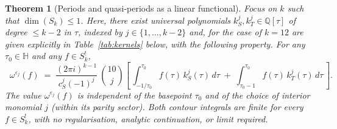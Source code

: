 \documentclass[11pt,letterpaper]{article}
\newtheorem{theorem}{Theorem}[section]
\newcommand{\HH}{\mathbb{H}}
\newcommand{\QQ}{\mathbb{Q}}
\newcommand{\eps}{\varepsilon}
\begin{document}
\begin{theorem}[Periods and quasi-periods as a linear functional]\label{thm:mainP}
Focus on $k$ such that $\dim(S_k) \leq 1$. Here, there exist universal polynomials 
$k_S^j, k_T^j \in \QQ[\tau]$ of degree $\le k-2$ in $\tau$, indexed by 
$j \in \{1, \ldots, k-2\}$ and, for the case of $k = 12$ are given explicitly in 
Table~\ref{tab:kernels} below, with the following property.  For any 
$\tau_0 \in \HH$ and any $f \in S_{k}^!$,
\begin{equation}\label{eq:main}
  \boxed{\;\;
  \omega^{\eps_j}(f) \;=\; \frac{(2\pi i)^{k-1}}{c_S^j (-1)^j}~ \binom{10}{j}
    \left[\,\int_{-1/\tau_0}^{\tau_0}\!\!f(\tau)\,k_S^{j}(\tau)\,d\tau
       \;+\; \int_{\tau_0 - 1}^{\tau_0}\!\!f(\tau)\,k_T^{j}(\tau)\,d\tau\,\right].
  \;\;}
\end{equation}
The value $\omega^{\eps_j}(f)$ is independent of the basepoint $\tau_0$
and of the choice of interior monomial $j$ (within its parity sector).
Both contour integrals are finite for every $f \in S_{k}^!$, with no
regularisation, analytic continuation, or limit required.
\end{theorem}%
\end{document}
